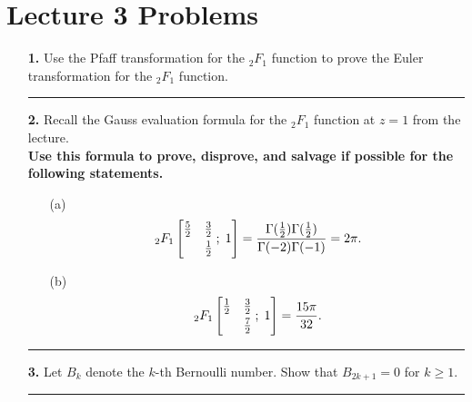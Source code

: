 \documentclass[12pt]{amsart}
\theoremstyle{definition}
\theoremstyle{remark}
\numberwithin{equation}{section}
\newcommand*\HYPERskip{&}
\newcommand*\pFq{
\begingroup
\catcode`\,\active
\def ,{\HYPERskip}%
\doHyper
}
\def\doHyper#1#2#3#4#5{%
\, _{#1}F_{#2}\left[\begin{matrix}#3 \smallskip \\  #4\end{matrix} \; ; \; #5\right]%
\endgroup
}
\begin{document}
\section*{Lecture 3 Problems}

\begin{itemize}

\item[\textbf{1.}] Use the Pfaff transformation for the $_{2}F_{1}$ function to prove the Euler transformation for the $_{2}F_{1}$ function.

\vspace{4mm}

\hrule{}

\vspace{8mm}

\item[\textbf{2.}] Recall the Gauss evaluation formula for the $_{2}F_{1}$ function at $z=1$ from the lecture.
\\

\textbf{Use this formula to prove, disprove, and salvage if possible for the following statements.}

\vspace{4mm}

\begin{itemize}

\item[(a)] $$\pFq{2}{1}{\frac{5}{2}&\frac{3}{2}}{&\frac{1}{2}}{1} = \frac{\Gamma(\frac{1}{2})\Gamma(\frac{1}{2})}{\Gamma(-2)\Gamma(-1)} = 2 \pi.$$

\vspace{4mm}

\item[(b)] $$\pFq{2}{1}{\frac{1}{2}&\frac{3}{2}}{&\frac{7}{2}}{1} = \frac{15 \pi}{32}.$$

\end{itemize}

\vspace{4mm}

\hrule{}

\vspace{8mm}

\item[\textbf{3.}] Let $B_{k}$ denote the $k$-th Bernoulli number. Show that $B_{2k+1} = 0$ for $k \geq 1$.

\vspace{4mm}

\hrule{}

\vspace{8mm}


\end{itemize}
\end{document}
